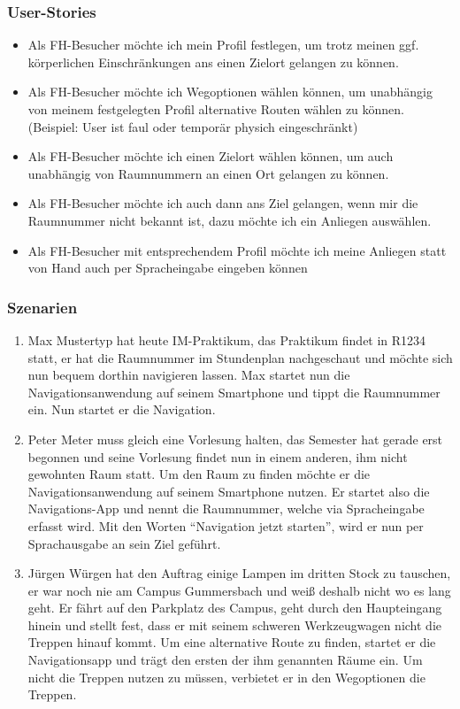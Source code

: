 \subsubsection*{User-Stories}
\begin{itemize}
\item Als FH-Besucher möchte ich mein Profil festlegen, um trotz meinen ggf. körperlichen Einschränkungen ans einen Zielort gelangen zu können.
\item Als FH-Besucher möchte ich Wegoptionen wählen können, um unabhängig von meinem festgelegten Profil alternative Routen wählen zu können. (Beispiel: User ist faul oder temporär physich eingeschränkt)
\item Als FH-Besucher möchte ich einen Zielort wählen können, um auch unabhängig von Raumnummern an einen Ort gelangen zu können.
\item Als FH-Besucher möchte ich auch dann ans Ziel gelangen, wenn mir die Raumnummer nicht bekannt ist, dazu möchte ich ein Anliegen auswählen.
\item Als FH-Besucher mit entsprechendem Profil möchte ich meine Anliegen statt von Hand auch per Spracheingabe eingeben können
\end{itemize}

\subsubsection*{Szenarien}
\begin{enumerate}
  \item Max Mustertyp hat heute IM-Praktikum, das Praktikum findet in R1234 statt, er hat die Raumnummer im Stundenplan nachgeschaut und möchte sich nun bequem dorthin navigieren lassen. Max startet nun die Navigationsanwendung auf seinem Smartphone und tippt die Raumnummer ein. Nun startet er die Navigation.
  \item Peter Meter muss gleich eine Vorlesung halten, das Semester hat gerade erst begonnen und seine Vorlesung findet nun in einem anderen, ihm nicht gewohnten Raum statt. Um den Raum zu finden möchte er die Navigationsanwendung auf seinem Smartphone nutzen. Er startet also die Navigations-App und nennt die Raumnummer, welche via Spracheingabe erfasst wird. Mit den Worten “Navigation jetzt starten”, wird er nun per Sprachausgabe an sein Ziel geführt.
  \item Jürgen Würgen hat den Auftrag einige Lampen im dritten Stock zu tauschen, er war noch nie am Campus Gummersbach und weiß deshalb nicht wo es lang geht. Er fährt auf den Parkplatz des Campus, geht durch den Haupteingang hinein und stellt fest, dass er mit seinem schweren Werkzeugwagen nicht die Treppen hinauf kommt. Um eine alternative Route zu finden, startet er die Navigationsapp und trägt den ersten der ihm genannten Räume ein. Um nicht die Treppen nutzen zu müssen, verbietet er in den Wegoptionen die Treppen.
\end{enumerate}

